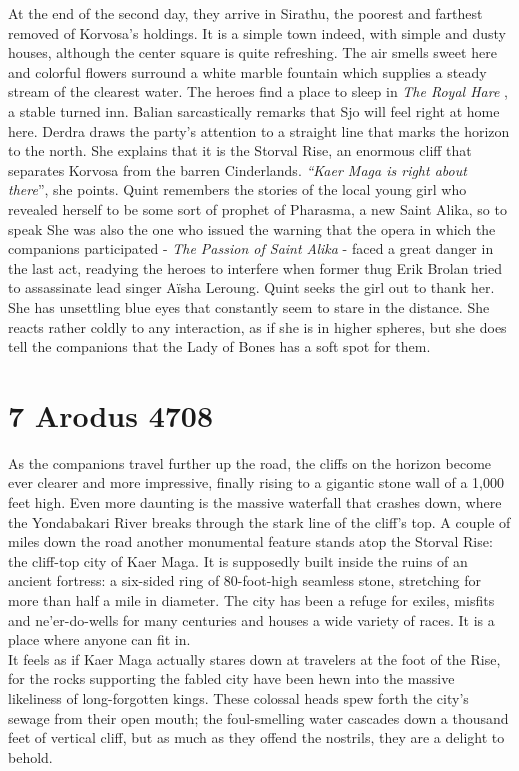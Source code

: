 At the end of the second day, they arrive in Sirathu, the poorest and farthest removed of Korvosa's holdings. It is a simple town indeed, with simple and dusty houses, although the center square is quite refreshing. The air smells sweet here and colorful flowers surround a white marble fountain which supplies a steady stream of the clearest water. The heroes find a place to sleep in {\itshape The Royal Hare} , a stable turned inn. Balian sarcastically remarks that Sjo will feel right at home here. Derdra draws the party's attention to a straight line that marks the horizon to the north. She explains that it is the Storval Rise, an enormous cliff that separates Korvosa from the barren Cinderlands. {\itshape``Kaer Maga is right about there}'', she points. Quint remembers the stories of the local young girl who revealed herself to be some sort of prophet of Pharasma, a new Saint Alika, so to speak She was also the one who issued the warning that the opera in which the companions participated - {\itshape The Passion of Saint Alika} - faced a great danger in the last act, readying the heroes to interfere when former thug Erik Brolan tried to assassinate lead singer A\"isha Leroung. Quint seeks the girl out to thank her. She has unsettling blue eyes that constantly seem to stare in the distance. She reacts rather coldly to any interaction, as if she is in higher spheres, but she does tell the companions that the Lady of Bones has a soft spot for them. \section{7 Arodus 4708}

As the companions travel further up the road, the cliffs on the horizon become ever clearer and more impressive, finally rising to a gigantic stone wall of a 1,000 feet high. Even more daunting is the massive waterfall that crashes down, where the Yondabakari River breaks through the stark line of the cliff's top. A couple of miles down the road another monumental feature stands atop the Storval Rise: the cliff-top city of Kaer Maga. It is supposedly built inside the ruins of an ancient fortress: a six-sided ring of 80-foot-high seamless stone, stretching for more than half a mile in diameter. The city has been a refuge for exiles, misfits and ne'er-do-wells for many centuries and houses a wide variety of races. It is a place where anyone can fit in.\\

It feels as if Kaer Maga actually stares down at travelers at the foot of the Rise, for the rocks supporting the fabled city have been hewn into the massive likeliness of long-forgotten kings. These colossal heads spew forth the city's sewage from their open mouth; the foul-smelling water cascades down a thousand feet of vertical cliff, but as much as they offend the nostrils, they are a delight to behold.\\

